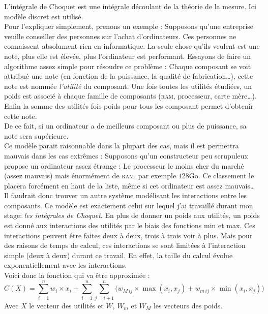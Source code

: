
L'intégrale de Choquet est une intégrale découlant de la théorie de la mesure\cite{artch}.
Ici modèle discret est utilisé.\\


Pour l'expliquer simplement, prenons un exemple :
Supposons qu'une entreprise veuille conseiller des personnes sur l'achat d'ordinateurs.
Ces personnes ne connaissent absolument rien en informatique.
La seule chose qu'ils veulent est une note, plus elle est élevée, plus l'ordinateur est performant.
Essayons de faire un algorithme assez simple pour résoudre ce problème :
Chaque composant se voit attribué une note (en fonction de la puissance, la qualité de fabrication\ldots),
cette note est nommée \textit{l'utilité} du composant.
Une fois toutes les utilités étudiées, un poids est associé à chaque famille de composants
(\textsc{ram}, processeur, carte mère\ldots).
Enfin la somme des utilités fois poids pour tous les composant permet d'obtenir cette note.\\
De ce fait, si un ordinateur a de meilleurs composant ou plus de puissance, sa note sera supérieure.\\


Ce modèle parait raisonnable dans la plupart des cas, mais il est permettra mauvais dans les cas extrêmes :
Supposons qu'un constructeur peu scrupuleux propose un ordinateur assez étrange :
Le processeur le moins cher du marché (assez mauvais) mais énormément de \textsc{ram}, par exemple $128$Go.
Ce classement le placera forcément en haut de la liste,
même si cet ordinateur est assez mauvais\ldots\\


Il faudrait donc trouver un autre système modélisant les interactions entre les composants.
Ce modèle est exactement celui sur lequel j'ai travaillé durant mon stage: \textit{les intégrales de Choquet}.
En plus de donner un poids aux utilités,
un poids est donné aux interactions des utilités par le biais des fonctions min et max.
Ces interactions peuvent être faites deux à deux, trois à trois voir à plus.
Mais pour des raisons de temps de calcul, ces interactions se sont limitées à l'interaction simple
(deux à deux) durant ce travail.
En effet, la taille du calcul évolue exponentiellement avec les interactions.\\


Voici donc la fonction qui va être approximée :
\begin{equation}
    \label{eq:Choquet}
    C(X)  =
    \sum_{i=1}^{n}
        w_i \times x_i +
    \sum_{i=1}^{n}\sum_{j=i+1}^{n}
    \Big(
        w_{M\,ij} \times \max(x_i,x_j) + w_{m\,ij} \times \min(x_i,x_j)
    \Big)
\end{equation}
Avec $X$ le vecteur des utilités et $W$, $W_m$ et $W_M$ les vecteurs des poids.
